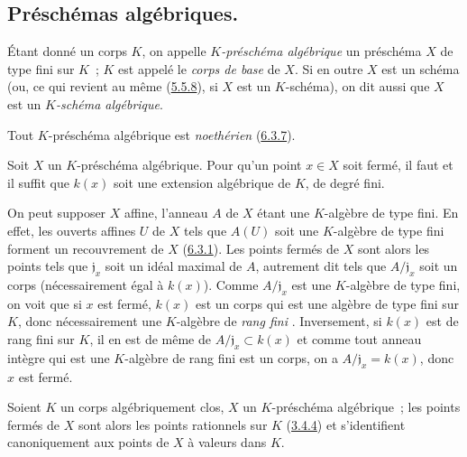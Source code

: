 \subsection{Préschémas algébriques.}
\label{subsection:I.6.4-fr}

\begin{definition}[6.4.1]
\label{I.6.4.1-fr}
Étant donné un corps $K$, on appelle \emph{$K$-préschéma algébrique} un
préschéma $X$ de type fini sur $K$~; $K$ est appelé le \emph{corps de base}
de $X$. Si en outre $X$ est un schéma (ou, ce qui revient au même
(\hyperref[I.5.5.8-fr]{5.5.8}), si $X$ est un $K$-schéma), on dit aussi que
$X$ est un \emph{$K$-schéma algébrique}.
\end{definition}

Tout $K$-préschéma algébrique est \emph{noethérien}
(\hyperref[I.6.3.7-fr]{6.3.7}).

\begin{proposition}[6.4.2]
\label{I.6.4.2-fr}
Soit $X$ un $K$-préschéma algébrique. Pour qu'un point $x\in X$ soit fermé,
il faut et il suffit que $k(x)$ soit une extension algébrique de $K$, de degré
fini.
\end{proposition}

On peut supposer $X$ affine, l'anneau $A$ de $X$ étant une $K$-algèbre de type
fini. En effet, les ouverts affines $U$ de $X$ tels que $A(U)$ soit une
$K$-algèbre de type fini forment un recouvrement de $X$
(\hyperref[I.6.3.1-fr]{6.3.1}). Les points fermés de $X$ sont alors les points
tels que $\mathfrak{j}_x$ soit
un idéal maximal de $A$, autrement dit tels que $A/\mathfrak{j}_x$ soit un
corps (nécessairement égal à $k(x)$). Comme $A/\mathfrak{j}_x$ est une
$K$-algèbre de type fini, on voit que si $x$ est fermé, $k(x)$ est un corps
qui est une algèbre de type fini sur $K$, donc nécessairement une $K$-algèbre
de \emph{rang fini} \cite{I-21}. Inversement, si $k(x)$ est de rang fini sur
$K$, il en est de même de $A/\mathfrak{j}_x\subset k(x)$ et comme tout anneau
intègre qui est une $K$-algèbre de rang fini est un corps, on a
$A/\mathfrak{j}_x=k(x)$, donc $x$ est fermé.

\begin{corollary}[6.4.3]
\label{I.6.4.3-fr}
Soient $K$ un corps algébriquement clos, $X$ un $K$-préschéma algébrique~; les
points fermés de $X$ sont alors les points rationnels sur $K$
(\hyperref[I.3.4.4-fr]{3.4.4}) et s'identifient canoniquement aux points de
$X$ à valeurs dans $K$.
\end{corollary}

